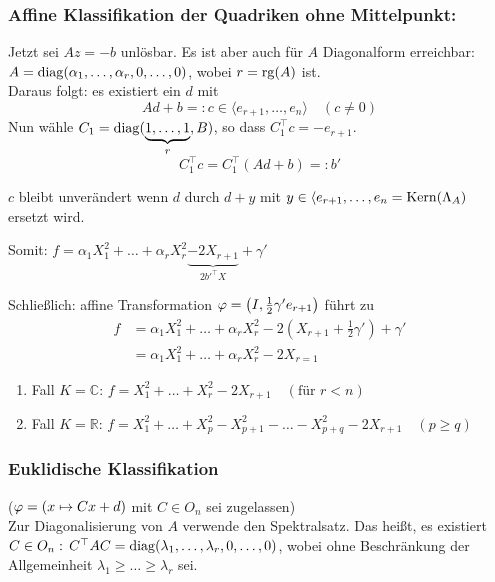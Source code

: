 \documentclass[parskip,a4paper,twoside,DIV15,BCOR12mm]{scrbook}
\begin{document}
\subsubsection{Affine Klassifikation der Quadriken ohne Mittelpunkt:}
Jetzt sei \(Az=-b\) unlösbar. Es ist aber auch für \(A\) Diagonalform 
erreichbar: \(A=\operatorname{diag}(\alpha_{1},\ldots,\alpha_{r},0,\ldots,0)\), wobei 
\(r=\operatorname{rg}(A)\) ist.\\
Daraus folgt: es existiert ein \(d\) mit
\[
Ad+b=:c\in\langle e_{r+1},\ldots,e_{n}\rangle\quad(c\neq0)
\]
Nun wähle \(C_{1}=\operatorname{diag}(\underbrace{1,\ldots,1}_{r},B)\), so dass 
\(C_{1}^{\top}c=-e_{r+1}\).
\[
C_{1}^{\top}c=C_{1}^{\top}(Ad+b)=:b'
\]
\begin{note}
\(c\) bleibt unverändert wenn \(d\) durch \(d+y\) mit 
\(y\in\langle e_{r+1},\ldots,e_{n}=\operatorname{Kern}(\Lambda_{A})\) ersetzt wird.
\end{note}
Somit: 
\(f=\alpha_{1}X_{1}^{2}+\ldots+\alpha_{r}X_{r}^{2}
    \underbrace{-2X_{r+1}}_{2b'^{\top}X}+\gamma'\)

Schließlich: affine Transformation 
\(\varphi=\left(I,\frac{1}{2}\gamma'e_{r+1}\right)\) führt zu 
\begin{align*}
f&=\alpha_{1}X_{1}^{2}+\ldots+\alpha_{r}X_{r}^{2}-2\left(X_{r+1}+\frac{1}{2}\gamma'\right)+\gamma'\\
&=\alpha_{1}X_{1}^{2}+\ldots+\alpha_{r}X_{r}^{2}-2X_{r=1}
\end{align*}
\begin{enumerate}
\item Fall \(K=\mathbb{C}\): \(f=X_{1}^{2}+\ldots+X_{r}^{2}-2X_{r+1}\quad(\text{für }r<n)\)
\item Fall \(K=\mathbb{R}\): \(f=X_{1}^{2}+\ldots+X_{p}^{2}-X_{p+1}^{2}-\ldots-X_{p+q}^{2}-2X_{r+1}\quad(p\geq q)\)
\end{enumerate}
\subsubsection{Euklidische Klassifikation}
(\(\varphi=(x\mapsto Cx+d)\) mit \(C\in O_{n}\) sei zugelassen)\\
Zur Diagonalisierung von \(A\) verwende den Spektralsatz. Das heißt, es
existiert \(C\in O_{n}:\,C^{\top}AC=\operatorname{diag}(\lambda_{1},\ldots,\lambda_{r},0,\ldots,0)\), 
wobei ohne Beschränkung der Allgemeinheit 
\(\lambda_{1}\geq\ldots\geq\lambda_{r}\) sei.
\end{document}
